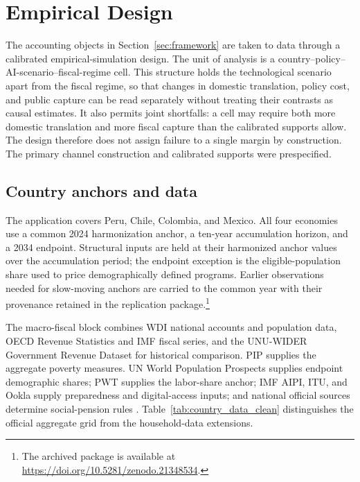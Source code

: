 \section{Empirical Design}\label{sec:design}

The accounting objects in Section~\ref{sec:framework} are taken to data through a calibrated empirical-simulation design. The unit of analysis is a country--policy--AI-scenario--fiscal-regime cell. This structure holds the technological scenario apart from the fiscal regime, so that changes in domestic translation, policy cost, and public capture can be read separately without treating their contrasts as causal estimates. It also permits joint shortfalls: a cell may require both more domestic translation and more fiscal capture than the calibrated supports allow. The design therefore does not assign failure to a single margin by construction. The primary channel construction and calibrated supports were prespecified.

\subsection{Country anchors and data}\label{subsec:country_data_clean}

The application covers Peru, Chile, Colombia, and Mexico. All four economies use a common 2024 harmonization anchor, a ten-year accumulation horizon, and a 2034 endpoint. Structural inputs are held at their harmonized anchor values over the accumulation period; the endpoint exception is the eligible-population share used to price demographically defined programs. Earlier observations needed for slow-moving anchors are carried to the common year with their provenance retained in the replication package.\footnote{The archived package is available at \url{https://doi.org/10.5281/zenodo.21348534}.}

The macro-fiscal block combines WDI national accounts and population data, OECD Revenue Statistics and IMF fiscal series, and the UNU-WIDER Government Revenue Dataset for historical comparison. PIP supplies the aggregate poverty measures. UN World Population Prospects supplies endpoint demographic shares; PWT supplies the labor-share anchor; IMF AIPI, ITU, and Ookla supply preparedness and digital-access inputs; and national official sources determine social-pension rules \citep{worldbank2026wdi,worldbank2026pip,oecd2025revenue,unu2025grd,unwpp2024,pwt1001,imf2024aipi,itu2026datahub,ookla2024speedtest}. Table~\ref{tab:country_data_clean} distinguishes the official aggregate grid from the household-data extensions.

